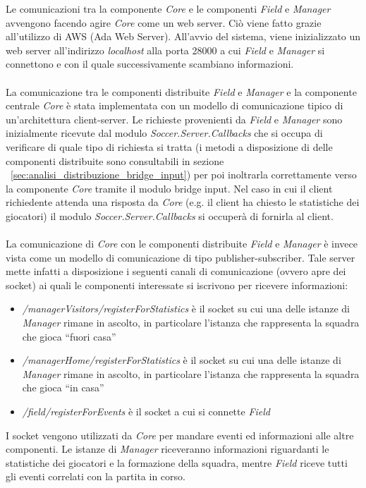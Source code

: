 Le comunicazioni tra la componente \emph{Core} e le componenti \emph{Field} e \emph{Manager} avvengono facendo agire \emph{Core} come un web server. Ci\`{o} viene fatto grazie all'utilizzo di AWS (Ada Web Server). All'avvio del sistema, viene inizializzato un web server all'indirizzo \emph{localhost} alla porta 28000 a cui \emph{Field} e \emph{Manager} si connettono e con il quale successivamente scambiano informazioni.\\\\ 
La comunicazione tra le componenti distribuite \emph{Field} e \emph{Manager} e la componente centrale \emph{Core} \`{e} stata implementata con un modello di comunicazione tipico di un’architettura client-server. Le richieste provenienti da \emph{Field} e \emph{Manager} sono inizialmente ricevute dal modulo \emph{Soccer.Server.Callbacks} che si occupa di verificare di quale tipo di richiesta si tratta (i metodi a disposizione di delle componenti distribuite sono consultabili in sezione ~\ref{sec:analisi_distribuzione_bridge_input}) per poi inoltrarla correttamente verso la componente \emph{Core} tramite il modulo bridge input. Nel caso in cui il client richiedente attenda una risposta da \emph{Core} (e.g. il client ha chiesto le statistiche dei giocatori) il modulo \emph{Soccer.Server.Callbacks} si occuper\`{a} di fornirla al client.\\\\
La comunicazione di \emph{Core} con le componenti distribuite \emph{Field} e \emph{Manager} \`{e} invece vista come un modello di comunicazione di tipo publisher-subscriber. Tale server mette infatti a disposizione i seguenti canali di comunicazione (ovvero apre dei socket) ai quali le componenti interessate si iscrivono per ricevere informazioni:
\begin{itemize}
\item \emph{/managerVisitors/registerForStatistics} \`{e} il socket su cui una delle istanze di \emph{Manager} rimane in ascolto, in particolare l'istanza che rappresenta la squadra che gioca ``fuori casa''
\item \emph{/managerHome/registerForStatistics} \`{e} il socket su cui una delle istanze di \emph{Manager} rimane in ascolto, in particolare l'istanza che rappresenta la squadra che gioca ``in casa''
\item \emph{/field/registerForEvents} \`{e} il socket a cui si connette \emph{Field}
\end{itemize}

\noindent I socket vengono utilizzati da \emph{Core} per mandare eventi ed informazioni alle altre componenti. Le istanze di \emph{Manager} riceveranno informazioni riguardanti le statistiche dei giocatori e la formazione della squadra, mentre \emph{Field} riceve tutti gli eventi correlati con la partita in corso. 


